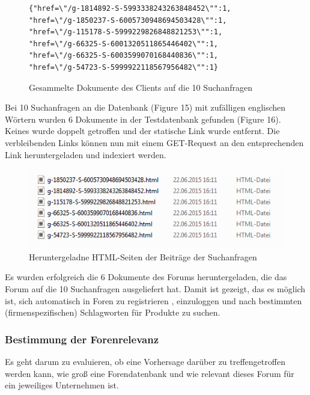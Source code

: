 \begin{figure}[h!]
\begin{lstlisting}[language=HTML5]
{"href=\"/g-1814892-S-5993338243263848452\"":1,
"href=\"/g-1850237-S-6005730948694503428\"":1,
"href=\"/g-115178-S-5999229826848821253\"":1,
"href=\"/g-66325-S-6001320511865446402\"":1,
"href=\"/g-66325-S-6003599070168440836\"":1,
"href=\"/g-54723-S-5999922118567956482\"":1}
\end{lstlisting}
\caption{Gesammelte Dokumente des Clients auf die 10 Suchanfragen}
\end{figure}

Bei 10 Suchanfragen an die Datenbank (Figure 15) mit zufälligen englischen Wörtern wurden 6 Dokumente in der Testdatenbank gefunden (Figure 16). Keines wurde doppelt getroffen und der statische Link wurde entfernt. Die verbleibenden Links können nun mit einem GET-Request an den entsprechenden Link heruntergeladen und indexiert werden.
\newpage

\begin{figure}[h!]
\includegraphics{./images/postdownload.png}
\caption{Heruntergeladne HTML-Seiten der Beiträge der Suchanfragen}
\end{figure}


Es wurden erfolgreich die 6 Dokumente des Forums heruntergeladen, die das Forum auf die 10 Suchanfragen ausgeliefert hat.
Damit ist gezeigt, das es möglich ist, sich automatisch in Foren zu registrieren , einzuloggen und nach bestimmten (firmenspezifischen) Schlagworten für Produkte zu suchen.

\subsubsection{Bestimmung der Forenrelevanz}

Es geht darum zu evaluieren, ob eine Vorhersage darüber zu treffengetroffen werden kann, wie groß eine Forendatenbank und wie relevant dieses Forum für ein jeweiliges Unternehmen ist.

